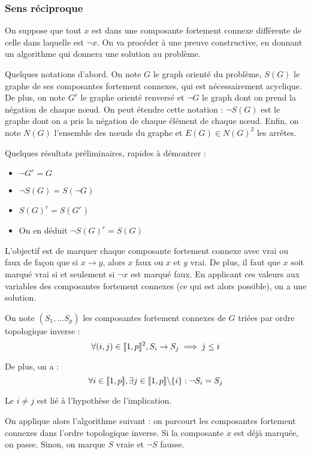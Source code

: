 \subsubsection{Sens réciproque}
On suppose que tout $x$ est dans une composante fortement connexe différente de
celle dans laquelle est $\neg x$. On va procéder à une preuve constructive, en
donnant un algorithme qui donnera une solution au problème.

Quelques notations d'abord. On note $G$ le graph orienté du problème, $S(G)$ le
graphe de ses composantes fortement connexes, qui est nécessairement acyclique.
De plus, on note $G^r$ le graphe orienté renversé et $\neg G$ le graph dont on
prend la négation de chaque nœud. On peut étendre cette notation : $\neg S(G)$
est le graphe dont on a pris la négation de chaque élément de chaque nœud.
Enfin, on note $N(G)$ l'ensemble des nœuds du graphe et $E(G) \in N(G)^2$ les
arrêtes.

Quelques résultats préliminaires, rapides à démontrer :
\begin{itemize}
 \item $\neg G^r = G$
 \item $\neg S(G) = S(\neg G)$
 \item $S(G)^r = S(G^r)$
 \item On en déduit $\neg S(G)^r = S(G)$
\end{itemize}

L'objectif est de marquer chaque composante fortement connexe avec vrai ou faux
de façon que si $x \rightarrow y$, alors $x$ faux ou $x$ et $y$ vrai. De plus,
il faut que $x$ soit marqué vrai si et seulement si $\neg x$ est marqué faux.
En applicant ces valeurs aux variables des composantes fortement connexes
(ce qui est alors possible), on a une solution.

On note $(S_1,\ldots S_p)$ les composantes fortement connexes de $G$ triées par
ordre topologique inverse :
    \[ \forall (i,j)\in\llbracket 1, p \rrbracket^2, S_i \rightarrow S_j \implies j \leq i \]

De plus, on a :
    \[ \forall i\in\llbracket 1, p \rrbracket, \exists j\in\llbracket 1, p \rrbracket\backslash\{i\}: \neg S_i = S_j \]

Le $i\neq j$ est lié à l'hypothèse de l'implication.

On applique alors l'algorithme suivant : on parcourt les composantes fortement
connexes dans l'ordre topologique inverse. Si la composante $x$ est déjà
marquée, on passe. Sinon, on marque $S$ vraie et $\neg S$ fausse.

